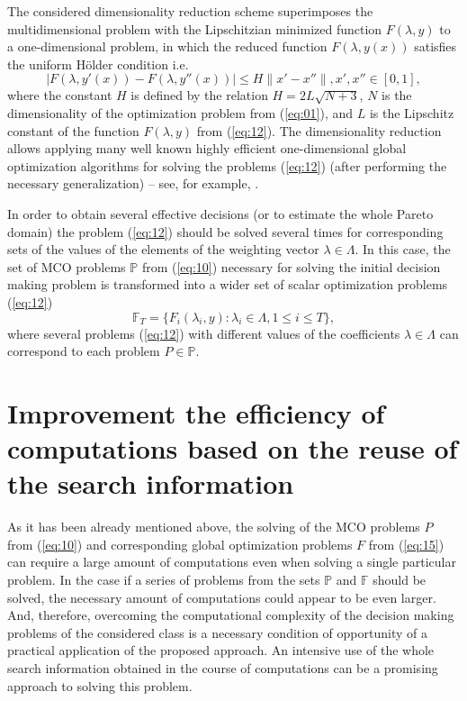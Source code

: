 \documentclass{svproc}
\begin{document}
The considered dimensionality reduction scheme superimposes the multidimensional problem with the Lipschitzian minimized function $F(\lambda,y)$ to a one-dimensional problem, in which the reduced function $F(\lambda,y(x))$ satisfies the uniform H\"{o}lder condition i.e.
\begin{equation}
\label{eq:16}
|F(\lambda,y'(x)) - F(\lambda, y''(x))| \leq H \|x' - x''\|, x', x'' \in [0,1], 
\end{equation}
where the constant $H$ is defined by the relation $H=2L\sqrt{N+3}$, $N$ is the dimensionality of the optimization problem from (\ref{eq:01}), and $L$ is the Lipschitz constant of the function $F(\lambda,y)$ from (\ref{eq:12}). The dimensionality reduction allows applying many well known highly efficient one-dimensional global optimization algorithms for solving the problems (\ref{eq:12}) (after performing the necessary generalization) -- see, for example, \cite{x18,x20,x29,x30,x31,x32,x33,x34,x35}.

In order to obtain several effective decisions (or to estimate the whole Pareto domain) the problem (\ref{eq:12}) should be solved several times for corresponding sets of the values of the elements of the weighting vector $\lambda \in \Lambda$. In this case, the set of MCO problems $\mathbb{P}$ from (\ref{eq:10}) necessary for solving the initial decision making problem is transformed into a wider set of scalar optimization problems (\ref{eq:12})
\begin{equation}
\label{eq:17}
\mathbb{F}_T=\{F_i (\lambda_i,y): \lambda_i \in \Lambda, 1 \leq i \leq T \},
\end{equation}
where several problems (\ref{eq:12}) with different values of the coefficients $\lambda \in \Lambda$ can correspond to each problem $P \in \mathbb{P}$.

\section{Improvement the efficiency of computations based on the reuse 
of the search information} 
\label{sec:04}
As it has been already mentioned above, the solving of the MCO problems $P$ from (\ref{eq:10}) and corresponding global optimization problems $F$ from (\ref{eq:15}) can require a large amount of computations even when solving a single particular problem. In the case if a series of problems from the sets $\mathbb{P}$ and $\mathbb{F}$ should be solved, the necessary amount of computations could appear to be even larger. And, therefore, overcoming the computational complexity of the decision making problems of the considered class is a necessary condition of opportunity of a practical application of the proposed approach. An intensive use of the whole search information obtained in the course of computations can be a promising approach to solving this problem. 
\end{document}
